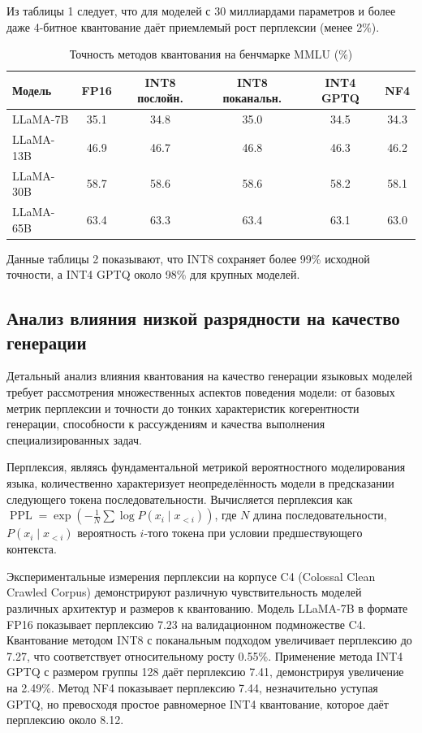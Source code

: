 \documentclass[bachelor, och, coursework]{SCWorks}
\begin{document}
	Из таблицы 1 следует, что для моделей с 30 миллиардами параметров и более даже 4-битное квантование даёт приемлемый рост перплексии (менее 2\%).
	
	\begin{table}[!ht]
		\centering
		\small
		\caption{Точность методов квантования на бенчмарке MMLU (\%)}
		\label{tab:mmlu}
		\begin{tabular}{|l|c|c|c|c|c|}
			\hline
			Модель & FP16 & INT8 послойн. & INT8 поканальн. & INT4 GPTQ & NF4 \\
			\hline
			LLaMA-7B & 35.1 & 34.8 & 35.0 & 34.5 & 34.3 \\
			\hline
			LLaMA-13B & 46.9 & 46.7 & 46.8 & 46.3 & 46.2 \\
			\hline
			LLaMA-30B & 58.7 & 58.6 & 58.6 & 58.2 & 58.1 \\
			\hline
			LLaMA-65B & 63.4 & 63.3 & 63.4 & 63.1 & 63.0 \\
			\hline
		\end{tabular}
	\end{table}
	
	Данные таблицы 2 показывают, что INT8 сохраняет более 99\% исходной точности, а INT4 GPTQ около 98\% для крупных моделей.
	
	\subsection{Анализ влияния низкой разрядности на качество генерации}
	
	Детальный анализ влияния квантования на качество генерации языковых моделей требует рассмотрения множественных аспектов поведения модели: от базовых метрик перплексии и точности до тонких характеристик когерентности генерации, способности к рассуждениям и качества выполнения специализированных задач.
	
	Перплексия, являясь фундаментальной метрикой вероятностного моделирования языка, количественно характеризует неопределённость модели в предсказании следующего токена последовательности. Вычисляется перплексия как \(\operatorname{PPL} = \exp\left(-\frac{1}{N} \sum \log P(x_i \mid x_{<i})\right)\), где \(N\) длина последовательности, \(P(x_i \mid x_{<i})\) вероятность \(i\)-того токена при условии предшествующего контекста.
	
	Экспериментальные измерения перплексии на корпусе C4 (Colossal Clean Crawled Corpus) демонстрируют различную чувствительность моделей различных архитектур и размеров к квантованию. Модель LLaMA-7B в формате FP16 показывает перплексию 7.23 на валидационном подмножестве C4. Квантование методом INT8 с поканальным подходом увеличивает перплексию до 7.27, что соответствует относительному росту 0.55\%. Применение метода INT4 GPTQ с размером группы 128 даёт перплексию 7.41, демонстрируя увеличение на 2.49\%. Метод NF4 показывает перплексию 7.44, незначительно уступая GPTQ, но превосходя простое равномерное INT4 квантование, которое даёт перплексию около 8.12.
	
\end{document}
